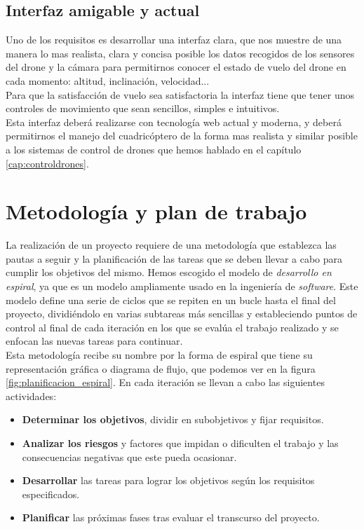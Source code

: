 \subsection{Interfaz amigable y actual}

Uno de los requisitos es desarrollar una interfaz clara, que nos muestre de una manera lo mas realista, clara y concisa posible los datos recogidos de los sensores del drone y la cámara para permitirnos conocer el estado de vuelo del drone en cada momento: altitud, inclinación, velocidad...\\


Para que la satisfacción de vuelo sea satisfactoria la interfaz tiene que tener unos controles de movimiento que sean sencillos, simples e intuitivos.\\

Esta interfaz deberá realizarse con tecnología web actual y moderna, y deberá permitirnos el manejo del cuadricóptero de la forma mas realista y similar posible a los sistemas de control de drones que hemos hablado en el capítulo \ref{cap:controldrones}.\\

\section{Metodología y plan de trabajo}

La realización de un proyecto requiere de una metodología que establezca las pautas a seguir y la planificación de las tareas que se deben llevar a cabo para cumplir los objetivos del mismo. Hemos escogido el modelo de \emph{desarrollo en espiral}, ya que es un modelo ampliamente usado en la ingeniería de \emph{software}. Este modelo define una serie de ciclos que se repiten en un bucle hasta el final del proyecto, dividiéndolo en varias subtareas más sencillas y estableciendo puntos de control al final de cada iteración en los que se evalúa el trabajo realizado y se enfocan las nuevas tareas para continuar.\\

Esta metodología recibe su nombre por la forma de espiral que tiene su representación gráfica o diagrama de flujo, que podemos ver en la figura \ref{fig:planificacion_espiral}. En cada iteración se llevan a cabo las siguientes actividades:

\begin{itemize}
 \item \textbf{Determinar los objetivos}, dividir en subobjetivos y fijar requisitos.
 \item \textbf{Analizar los riesgos} y factores que impidan o dificulten el trabajo y las consecuencias negativas que este
 pueda ocasionar.
 \item \textbf{Desarrollar} las tareas para lograr los objetivos según los requisitos especificados.
 \item \textbf{Planificar} las próximas fases tras evaluar el transcurso del proyecto.
\end{itemize}

